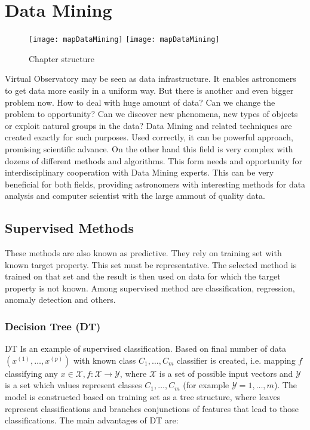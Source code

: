 \chapter{Data Mining}

\begin{figure}[!htbp]
  \begin{center}
    \leavevmode
    \ifpdf
    \texttt{[image: mapDataMining]}
    \else
    \texttt{[image: mapDataMining]}
    \fi
    \caption{Chapter structure}
    \label{FigStructure}
  \end{center}
\end{figure}

\label{chap:dataMining}
\noindent Virtual Observatory may be seen as data infrastructure. It enables
astronomers to get data more easily in a uniform way. But there is
another and even bigger problem now. How to deal with huge amount of
data? Can we change the problem to opportunity? Can we discover new
phenomena, new types of objects or exploit natural groups in the data?
Data Mining and related techniques are created exactly for such
purposes. Used correctly, it can be powerful approach, promising
scientific advance. On the other hand this field is very complex with
dozens of different methods and algorithms. This form needs and
opportunity for interdisciplinary cooperation with Data Mining
experts. This can be very beneficial for both fields, providing
astronomers with interesting methods for data analysis and computer
scientist with the large ammout of quality data.

\section{Supervised Methods}
These methods are also known as predictive\citep{ball2010data}. They
rely on training set with known target property. This set must be
representative. The selected method is trained on that set and the
result is then used on data for which the target property is not
known. Among supervised method are classification, regression, anomaly
detection and others.

\subsection{Decision Tree (DT)}
DT Is an example of supervised classification. Based on final number of
data $(x^{(1)},\ldots,x^{(p)})$ with known class $C_1,\ldots, C_m$
classifier is created, i.e. mapping $f$ classifying any $x \in
\mathcal{X}, f:\mathcal{X}\rightarrow \mathcal{Y}$, where
$\mathcal{X}$ is a set of possible input vectors and $\mathcal{Y}$ is
a set which values represent classes $C_1,\ldots, C_m$ (for example
$\mathcal{Y} = {1,\ldots,m}$). The model is constructed based on
training set as a tree structure, where leaves represent
classifications and branches conjunctions of features that lead to
those classifications. The main advantages of DT are:

